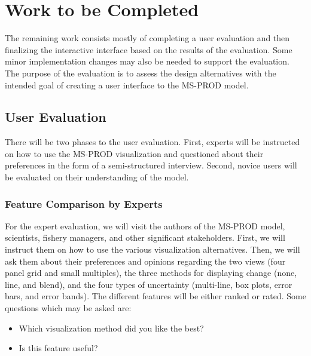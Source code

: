 \chapter{Work to be Completed}
The remaining work consists mostly of completing a user evaluation and then finalizing the interactive interface based on the results of the evaluation. Some minor implementation changes may also be needed to support the evaluation.  The purpose of the evaluation is to assess the design alternatives with the intended goal of creating a user interface to the MS-PROD model.%

\section{User Evaluation}

There will be two phases to the user evaluation.  First, experts will be instructed on how to use the MS-PROD visualization and questioned about their preferences in the form of a semi-structured interview.  Second, novice users will be evaluated on their understanding of the model.

\subsection{Feature Comparison by Experts}

For the expert evaluation, we will visit the authors of the MS-PROD model, scientists, fishery managers, and other significant stakeholders.  First, we will instruct them on how to use the various visualization alternatives.  Then, we will ask them about their preferences and opinions regarding the two views (four panel grid and small multiples), the three methods for displaying change (none, line, and blend), and the four types of uncertainty (multi-line, box plots, error bars, and error bands).  The different features will be either ranked or rated.  Some questions which may be asked are:

\begin{itemize}
  \item Which visualization method did you like the best?
  \item Is this feature useful?
\end{itemize}

